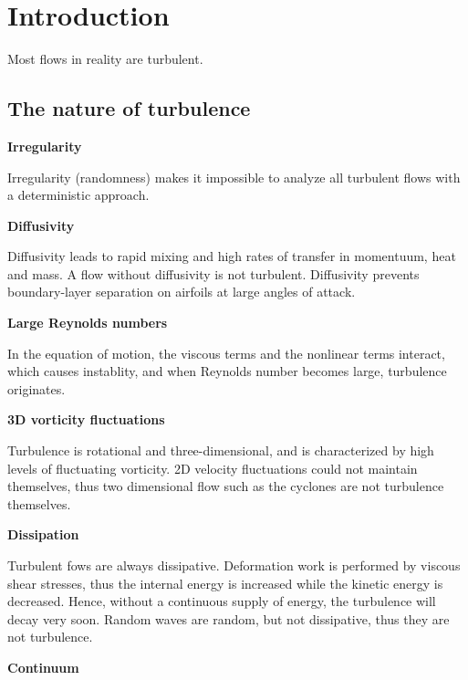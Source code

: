\section{Introduction}

Most flows in reality are turbulent.

\subsection{The nature of turbulence}

\textbf{Irregularity}

Irregularity (randomness) makes it impossible to analyze all turbulent flows with a deterministic approach.

\textbf{Diffusivity}

Diffusivity leads to rapid mixing and high rates of transfer in momentuum, heat and mass. A flow without diffusivity is not turbulent.
Diffusivity prevents boundary-layer separation on airfoils at large angles of attack.

\textbf{Large Reynolds numbers}

In the equation of motion, the viscous terms and the nonlinear terms interact, which causes instablity, and when Reynolds number becomes large, turbulence originates.

\textbf{3D vorticity fluctuations}

Turbulence is rotational and three-dimensional, and is characterized by high levels of fluctuating vorticity. 
2D velocity fluctuations could not maintain themselves, thus two dimensional flow such as the cyclones are not turbulence themselves.

\textbf{Dissipation}

Turbulent fows are always dissipative. Deformation work is performed by viscous shear stresses, thus the internal energy is increased while the kinetic energy is decreased.
Hence, without a continuous supply of energy, the turbulence will decay very soon.
Random waves are random, but not dissipative, thus they are not turbulence.

\textbf{Continuum}

